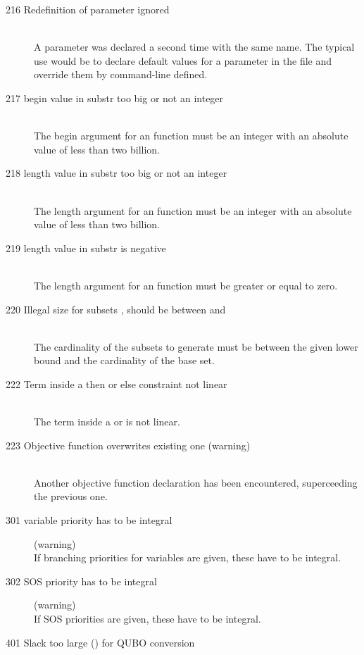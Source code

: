\begin{description}
\item[216 Redefinition of parameter  ignored]\ \\
   A parameter was declared a second time with the same name. The
   typical use would be to declare default values for a parameter in
   the \zimpl file and override them by command-line defined.
\item[217 begin value  in substr too big or not an integer]\ \\
   The begin argument for an  function
   must be an integer with an absolute value of less than two billion.
\item[218 length value  in substr too big or not an integer]\ \\
   The length argument for an  function
   must be an integer with an absolute value of less than two billion.
\item[219 length value  in substr is negative]\ \\
   The length argument for an  function
   must be greater or equal to zero.
\item[220 Illegal size for subsets , should be between  
  and ]\ \\
  The cardinality of the subsets to generate must be between the
  given lower bound and the cardinality of the base set.
\item[222 Term inside a then or else constraint not linear]\ \\
  The term inside a  or  is not linear.
\item[223 Objective function  overwrites existing one
  (warning)]\ \\
  Another objective function declaration has been encountered,
  superceeding the previous one. 
\item[301 variable priority has to be integral] (warning)\ \\
   If branching priorities for variables are given, these have to be integral.
\item[302 SOS priority has to be integral] (warning)\ \\
   If SOS priorities are given, these have to be integral.
\item [401 Slack too large () for QUBO conversion]

\end{description}
